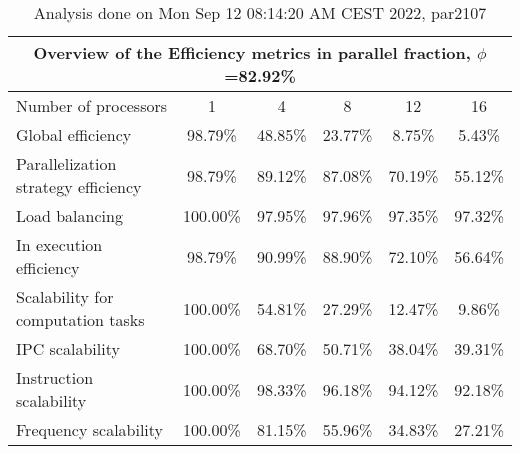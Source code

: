 \begin{table}[h]
\begin{center}
\begin{tabular}{|l|c|c|c|c|c|}
\hline
\multicolumn{6}{|c|}{Overview of the Efficiency metrics in parallel fraction, $\phi$=82.92\%} \\
\hline
\hline
Number of processors & 1 & 4 & 8 & 12 & 16 \\
\hline
\hline
Global efficiency                      &     98.79\% &     48.85\% &     23.77\% &      8.75\% &      5.43\% \\
\hline
\hline
Parallelization strategy efficiency &     98.79\% &     89.12\% &     87.08\% &     70.19\% &     55.12\% \\
\hline
Load balancing                   &    100.00\% &     97.95\% &     97.96\% &     97.35\% &     97.32\% \\
In execution efficiency          &     98.79\% &     90.99\% &     88.90\% &     72.10\% &     56.64\% \\
\hline
\hline
Scalability for computation tasks   &    100.00\% &     54.81\% &     27.29\% &     12.47\% &      9.86\% \\
\hline
IPC scalability                  &    100.00\% &     68.70\% &     50.71\% &     38.04\% &     39.31\% \\
Instruction scalability          &    100.00\% &     98.33\% &     96.18\% &     94.12\% &     92.18\% \\
Frequency scalability            &    100.00\% &     81.15\% &     55.96\% &     34.83\% &     27.21\% \\
\hline
\end{tabular}
\end{center}
\caption{ Analysis done on Mon Sep 12 08:14:20 AM CEST 2022, par2107}
\end{table}
